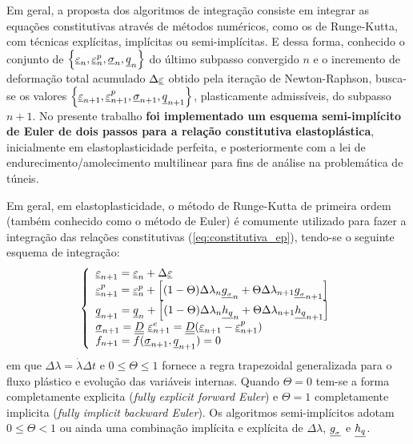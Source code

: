 Em geral, a proposta dos algoritmos de integração consiste em integrar as equações constitutivas através de métodos numéricos, como os de Runge-Kutta, com técnicas explícitas, implícitas ou semi-implícitas. E dessa forma, conhecido o conjunto de $\left\{ \underline{\varepsilon}_n, \underline{\varepsilon}_n^p,\underline \sigma_n,\underline q_n \right\}$ do último subpasso convergido $n$ e o incremento de deformação total acumulado $\Delta \underline{\varepsilon}$ obtido pela iteração de Newton-Raphson, busca-se os valores $\left\{ \underline{\varepsilon}_{n+1}, \underline{\varepsilon}_{n+1}^p,\underline \sigma_{n+1},\underline q_{n+1} \right\}$, plasticamente admissíveis, do subpasso $n+1$. No presente trabalho \textbf{foi implementado um esquema semi-implícito de Euler de dois passos para a relação constitutiva elastoplástica}, inicialmente em elastoplasticidade perfeita, e posteriormente com a lei de endurecimento/amolecimento multilinear para fins de análise na problemática de túneis.

Em geral, em elastoplasticidade, o método de Runge-Kutta de primeira ordem (também conhecido como o método de Euler) é comumente utilizado para fazer a integração das relações constitutivas (\ref{eq:constitutiva_ep}), tendo-se o seguinte esquema de integração:
\begin{equation}
	\label{eq:esquema_int_constitutiva_ep}
	\left\{
	\begin{array}{lcl}
		\underline{\varepsilon}_{n+1} = \underline{\varepsilon}_n + \Delta \underline{\varepsilon} \\
		\underline{\varepsilon}_{n+1}^p = \underline{\varepsilon}_n^p + \left[(1-\Theta) \Delta \lambda_n \underline{g_{_\sigma}}_n + \Theta \Delta \lambda_{n+1} \underline{g_{_\sigma}}_{n+1}\right] \\
		\underline q_{n+1} = \underline q_n + \left[(1-\Theta) \Delta \lambda_n \underline{h_q}_n + \Theta \Delta \lambda_{n+1} \underline{h_q}_{n+1}\right] \\	
		\underline \sigma_{n+1} = \underline{\underline D}~\underline{\varepsilon}_{n+1}^e = \underline{\underline D}( \underline{\varepsilon}_{n+1} - \underline{\varepsilon}_{n+1}^p) \\
		f_{n+1} = f(\underline \sigma_{n+1},\underline q_{n+1}) = 0		
	\end{array}
	\right.
\end{equation}
em que $\Delta \lambda = \dot\lambda\Delta t$ e $0 \leq \Theta \leq 1$ fornece a regra trapezoidal generalizada para o fluxo plástico e evolução das variáveis internas. Quando $\Theta = 0$ tem-se a forma completamente explicita (\textit{fully explicit forward Euler}) e $\Theta = 1$  completamente implicita (\textit{fully implicit backward Euler}). Os algoritmos semi-implícitos adotam $0 \leq \Theta < 1$  ou ainda uma combinação implícita e explícita de $\Delta \lambda$, $\underline{g_{_\sigma}}$ e $\underline{h_q}$.

